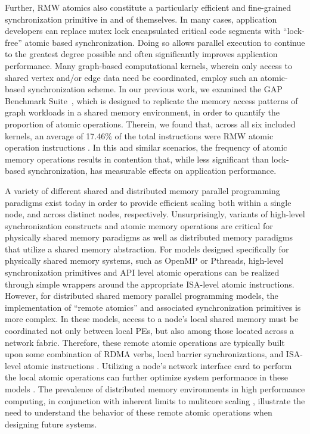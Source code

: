 Further, RMW atomics also constitute a particularly efficient and fine-grained synchronization primitive in and of themselves.
In many cases, application developers can replace mutex lock encapsulated critical code segments with ``lock-free'' atomic based synchronization.
Doing so allows parallel execution to continue to the greatest degree possible and often significantly improves application performance.
Many graph-based computational kernels, wherein only access to shared vertex and/or edge data need be coordinated, employ such an atomic-based synchronization scheme.
In our previous work, we examined the GAP Benchmark Suite~\cite{beamer2015gap}, which is designed to replicate the memory access patterns of graph workloads in a shared memory environment, in order to quantify the proportion of atomic operations.
Therein, we found that, across all six included kernels, an average of 17.46\% of the total instructions were RMW atomic operation instructions \cite{rae}.
In this and similar scenarios, the frequency of atomic memory operations results in contention that, while less significant than lock-based synchronization, has measurable effects on application performance.

A variety of different shared and distributed memory parallel programming paradigms exist today in order to provide efficient scaling both within a single node, and across distinct nodes, respectively.
Unsurprisingly, variants of high-level synchronization constructs and atomic memory operations are critical for physically shared memory paradigms as well as distributed memory paradigms that utilize a shared memory abstraction.
For models designed specifically for physically shared memory systems, such as OpenMP or Pthreads, high-level synchronization primitives and API level atomic operations can be realized through simple wrappers around the appropriate ISA-level atomic instructions.
However, for distributed shared memory parallel programming models, the implementation of ``remote atomics'' and associated synchronization primitives is more complex.
In these models, access to a node's local shared memory must be coordinated not only between local PEs, but also among those located across a network fabric.
Therefore, these remote atomic operations are typically built upon some combination of RDMA verbs, local barrier synchronizations, and ISA-level atomic instructions \cite{chen2017rdmahtm}\cite{kalia2016rdmadesign}.
Utilizing a node's network interface card to perform the local atomic operations can further optimize system performance in these models \cite{rae}.
The prevalence of distributed memory environments in high performance computing, in conjunction with inherent limits to mulitcore scaling \cite{esmaeilzadeh2011silicon}, illustrate the need to understand the behavior of these remote atomic operations when designing future systems.

